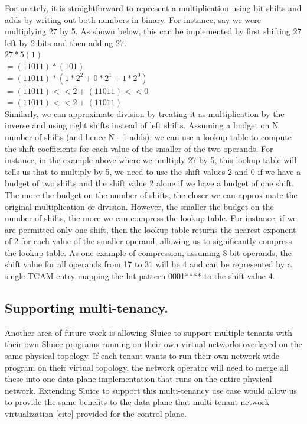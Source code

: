 \documentclass[12pt, oneside]{article}
\begin{document}
Fortunately, it is straightforward to represent a multiplication using bit shifts and adds by writing out both numbers in binary. For instance, say we were multiplying 27 by 5. As shown below, this can be implemented by first shifting 27 left by 2 bits and then adding 27.\\
$27 * 5 (1)$\\
$= (11011) * (101)$\\
$= (11011) * (1 * 2^2 + 0 * 2^1 + 1 * 2^0)$\\
$= (11011) << 2 + (11011) << 0$\\
$= (11011) << 2 + (11011)$\\
Similarly, we can approximate division by treating it as multiplication by the inverse and using right shifts instead of left shifts. Assuming a budget on N number of shifts (and hence N - 1 adds), we can use a lookup table to compute the shift coefficients for each value of the smaller of the two operands. For instance, in the example above where we multiply 27 by 5, this lookup table will tells us that to multiply by 5, we need to use the shift values 2 and 0 if we have a budget of two shifts and the shift value 2 alone if we have a budget of one shift.
The more the budget on the number of shifts, the closer we can approximate the original multiplication or division. However, the smaller the budget on the number of shifts, the more we can compress the lookup table. For instance, if we are permitted only one shift, then the lookup table returns the nearest exponent of 2 for each value of the smaller operand, allowing us to significantly compress the lookup table. As one example of compression, assuming 8-bit operands, the shift value for all operands from 17 to 31 will be 4 and can be represented by a single TCAM entry mapping the bit pattern 0001**** to the shift value 4.

\subsection{Supporting multi-tenancy.} Another area of future work is allowing
Sluice to support multiple tenants with their own Sluice
programs running on their own virtual networks overlayed on the same physical
topology. If each tenant wants to run their own network-wide program on their
virtual topology, the network operator will need to merge all these into one
data plane implementation that runs on the entire physical network. Extending
Sluice to support this multi-tenancy use case would allow us to provide the
same benefits to the data plane that multi-tenant network
virtualization [cite] provided for the control plane.
\end{document}
